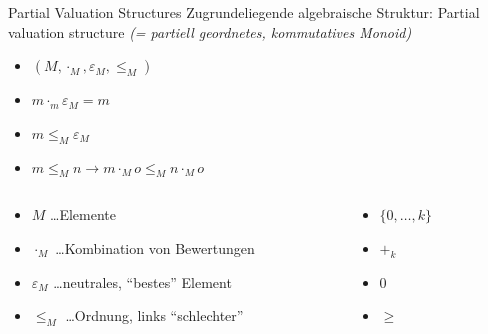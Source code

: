\begin{frame}{Partial Valuation Structures}
Zugrundeliegende \alert{algebraische Struktur}:
Partial valuation structure \emph{(= partiell geordnetes, kommutatives Monoid)}
\begin{itemize}
\item $(M, \cdot_M, \varepsilon_M, \leq_M)$ 
\item $m \cdot_m \varepsilon_M = m$
\item $m \leq_M \varepsilon_M$
\item $m \leq_M n \rightarrow m \cdot_M o \leq_M n \cdot_M o$
\end{itemize}

\vspace*{2ex}

\begin{columns}[onlytextwidth,T]
    
    \begin{column}{.7\textwidth}
          
    
    \begin{itemize}
    \item $M$ \ldots Elemente
    \item $\cdot_M$ \ldots Kombination von Bewertungen
    \item $\varepsilon_M$ \ldots neutrales, ``bestes'' Element
    \item $\leq_M$ \ldots Ordnung, links ``schlechter''
    \end{itemize}
    \end{column}
    
    \begin{column}{.3\textwidth}
  	 \begin{itemize}
    \item $\{0, \ldots, k \}$ 
    \item $+_k$
    \item $0$ 
    \item $\geq$
    \end{itemize}
    \end{column}
  \end{columns}

  \vspace*{2ex}
  
  \hfill \emph{\cite{Gadducci2013,SchiendorferPvs2015}}
\end{frame}

